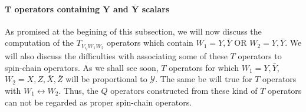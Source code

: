 \paragraph[$T$ operators containing $Y$ and $\bar{Y}$ scalars]{$\mathbf{T}$ operators containing $\mathbf{Y}$ and $\mathbf{\bar{Y}}$ scalars}
As promised at the begining of this subsection, we will now discuss the computation of the $T_{V_{i_\ell} W_1 W_2}$ operators which contain $W_1 = Y, \bar{Y}$ OR $W_2 = Y, \bar{Y}$. We will also discuss the difficulties with associating some of these $T$ operators to spin-chain operators. As we shall see soon, $T$ operators for which $W_1 = Y, \bar{Y}$, $W_2 = X, Z, \bar{X}, \bar{Z}$ will be proportional to $\mathcal{Y}$. The same be will true for $T$ operators with $W_1 \leftrightarrow W_2$. Thus, the $Q$ operators constructed from these kind of $T$ operators can not be regarded as proper spin-chain operators.

